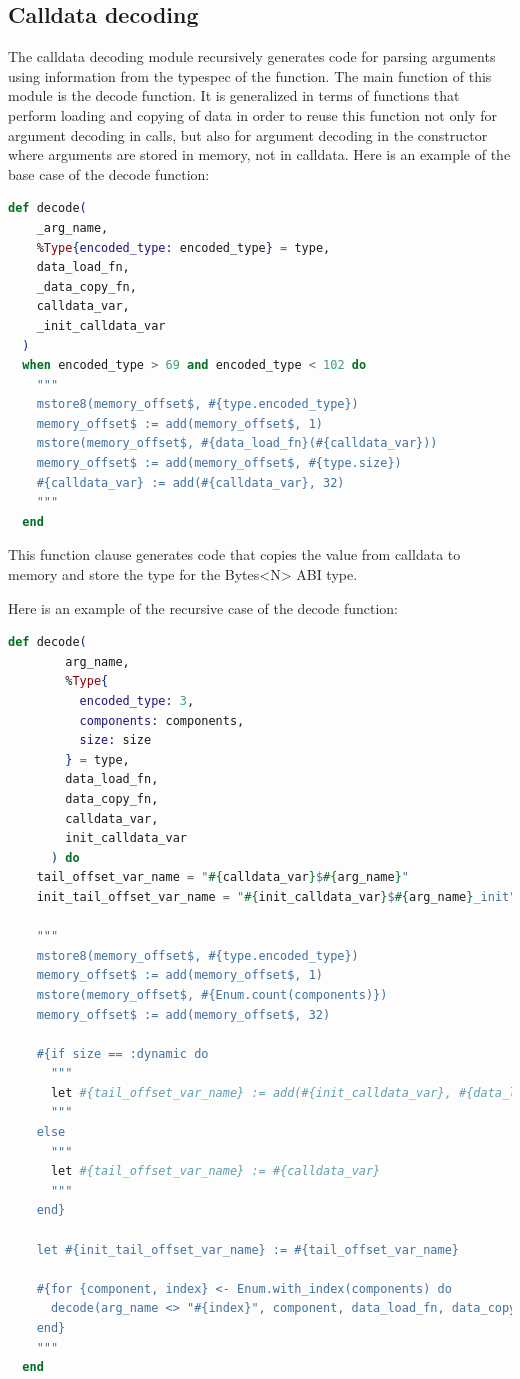 \subsection{Calldata decoding}
\label{ssec:calldata_decoding}
The calldata decoding module recursively generates code for parsing arguments using information from the typespec of the function. The main function of this module is the decode function. It is generalized in terms of functions that perform loading and copying of data in order to reuse this function not only for argument decoding in calls, but also for argument decoding in the constructor where arguments are stored in memory, not in calldata. Here is an example of the base case of the decode function:

\begin{lstlisting}[caption={Calldata decoding base case}, language=elixir, label={lst:calldata_decoding_base}]
  def decode(
    _arg_name,
    %Type{encoded_type: encoded_type} = type,
    data_load_fn,
    _data_copy_fn,
    calldata_var,
    _init_calldata_var
  )
  when encoded_type > 69 and encoded_type < 102 do
    """
    mstore8(memory_offset$, #{type.encoded_type})
    memory_offset$ := add(memory_offset$, 1)
    mstore(memory_offset$, #{data_load_fn}(#{calldata_var}))
    memory_offset$ := add(memory_offset$, #{type.size})
    #{calldata_var} := add(#{calldata_var}, 32)
    """
  end
\end{lstlisting}

This function clause generates code that copies the value from calldata to memory and store the type for the Bytes<N> ABI type.

Here is an example of the recursive case of the decode function:

\begin{lstlisting}[caption={Calldata decoding recursive case}, language=elixir, label={lst:calldata_decoding_recursive}]
  def decode(
        arg_name,
        %Type{
          encoded_type: 3,
          components: components,
          size: size
        } = type,
        data_load_fn,
        data_copy_fn,
        calldata_var,
        init_calldata_var
      ) do
    tail_offset_var_name = "#{calldata_var}$#{arg_name}"
    init_tail_offset_var_name = "#{init_calldata_var}$#{arg_name}_init"

    """
    mstore8(memory_offset$, #{type.encoded_type})
    memory_offset$ := add(memory_offset$, 1)
    mstore(memory_offset$, #{Enum.count(components)})
    memory_offset$ := add(memory_offset$, 32)

    #{if size == :dynamic do
      """
      let #{tail_offset_var_name} := add(#{init_calldata_var}, #{data_load_fn}(#{calldata_var}))
      """
    else
      """
      let #{tail_offset_var_name} := #{calldata_var}
      """
    end}

    let #{init_tail_offset_var_name} := #{tail_offset_var_name}

    #{for {component, index} <- Enum.with_index(components) do
      decode(arg_name <> "#{index}", component, data_load_fn, data_copy_fn, tail_offset_var_name, init_tail_offset_var_name)
    end}
    """
  end
\end{lstlisting}

